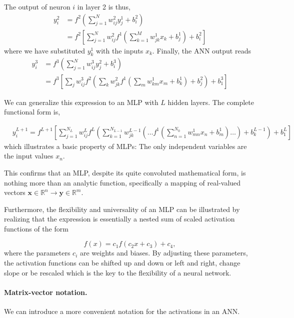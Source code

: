 \documentclass[%
oneside,                 %
final,                   %
10pt]{article}
\begin{document}
The output of neuron $i$ in layer 2 is thus,
\begin{align}
 y_i^2 &= f^2\left(\sum_{j=1}^N w_{ij}^2 y_j^1 + b_i^2\right) \\
 &= f^2\left[\sum_{j=1}^N w_{ij}^2f^1\left(\sum_{k=1}^M w_{jk}^1 x_k + b_j^1\right) + b_i^2\right]
 \label{outputLayer2}
\end{align}
where we have substituted $y_k^1$ with the inputs $x_k$. Finally, the ANN output reads
\begin{align}
 y_i^3 &= f^3\left(\sum_{j=1}^N w_{ij}^3 y_j^2 + b_i^3\right) \\
 &= f^3\left[\sum_{j} w_{ij}^3 f^2\left(\sum_{k} w_{jk}^2 f^1\left(\sum_{m} w_{km}^1 x_m + b_k^1\right) + b_j^2\right)
  + b_1^3\right]
\end{align}

We can generalize this expression to an MLP with $L$ hidden
layers. The complete functional form is,

\begin{align}
&y^{L+1}_i = f^{L+1}\left[\!\sum_{j=1}^{N_L} w_{ij}^L f^L \left(\sum_{k=1}^{N_{L-1}}w_{jk}^{L-1}\left(\dots f^1\left(\sum_{n=1}^{N_0} w_{mn}^1 x_n+ b_m^1\right)\dots\right)+b_k^{L-1}\right)+b_1^L\right] &&
 \label{completeNN}
\end{align}
which illustrates a basic property of MLPs: The only independent
variables are the input values $x_n$.

This confirms that an MLP, despite its quite convoluted mathematical
form, is nothing more than an analytic function, specifically a
mapping of real-valued vectors $\boldsymbol{x} \in \mathbb{R}^n \rightarrow
\boldsymbol{y} \in \mathbb{R}^m$.

Furthermore, the flexibility and universality of an MLP can be
illustrated by realizing that the expression is essentially a nested
sum of scaled activation functions of the form

\begin{equation}
 f(x) = c_1 f(c_2 x + c_3) + c_4,
\end{equation}
where the parameters $c_i$ are weights and biases. By adjusting these
parameters, the activation functions can be shifted up and down or
left and right, change slope or be rescaled which is the key to the
flexibility of a neural network.

\paragraph{Matrix-vector notation.}
We can introduce a more convenient notation for the activations in an ANN. 
\end{document}
